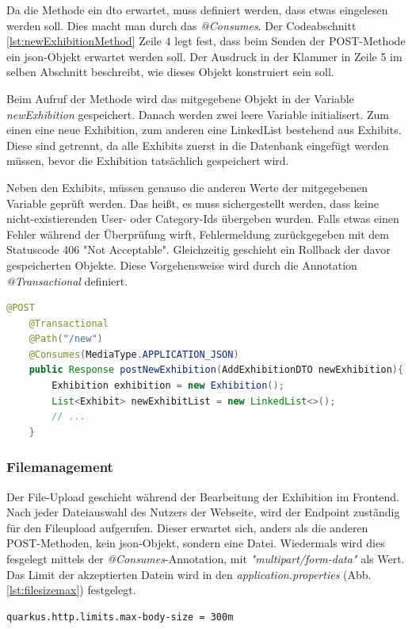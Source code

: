 Da die Methode ein \gls{dto} erwartet, muss definiert werden, dass etwas eingelesen werden soll. 
Dies macht man durch das \emph{@Consumes}. 
Der Codeabschnitt \ref{lst:newExhibitionMethod} Zeile 4 legt fest, dass beim Senden der POST-Methode ein \gls{json}-Objekt erwartet werden soll. 
Der Ausdruck in der Klammer in Zeile 5 im selben Abschnitt beschreibt, wie dieses Objekt konstruiert sein soll.

Beim Aufruf der Methode wird das mitgegebene Objekt in der Variable \emph{newExhibition} gespeichert.
Danach werden zwei leere Variable initialisert. 
Zum einen eine neue Exhibition, zum anderen eine LinkedList bestehend aus Exhibits.
Diese sind getrennt, da alle Exhibits zuerst in die Datenbank eingefügt werden müssen, bevor die Exhibition tatsächlich gespeichert wird. 

Neben den Exhibits, müssen genauso die anderen Werte der mitgegebenen Variable geprüft werden. 
Das heißt, es muss sichergestellt werden, dass keine nicht-existierenden User- oder Category-Ids übergeben wurden. 
Falls etwas einen Fehler während der Überprüfung wirft, Fehlermeldung zurückgegeben mit dem Statuscode 406 "Not Acceptable". 
Gleichzeitig geschieht ein Rollback der davor gespeicherten Objekte. 
Diese Vorgehensweise wird durch die Annotation \emph{@Transactional} definiert. 

\begin{lstlisting}[label=lst:newExhibitionMethod, language=Java, caption=Methode zum Anlegen von Exhibitions]
    @POST
    @Transactional
    @Path("/new")
    @Consumes(MediaType.APPLICATION_JSON)
    public Response postNewExhibition(AddExhibitionDTO newExhibition){
        Exhibition exhibition = new Exhibition();
        List<Exhibit> newExhibitList = new LinkedList<>();
        // ...
    }
\end{lstlisting}

\subsubsection{Filemanagement}
Der File-Upload geschieht während der Bearbeitung der Exhibition im Frontend. 
Nach jeder Dateiauswahl des Nutzers der Webseite, wird der Endpoint zuständig für den Fileupload aufgerufen. 
Dieser erwartet sich, anders als die anderen POST-Methoden, kein \gls{json}-Objekt, sondern eine Datei. 
Wiedermals wird dies fesgelegt mittels der \emph{@Consumes}-Annotation, mit \emph{"multipart/form-data"} als Wert. 
Das Limit der akzeptierten Datein wird in den \emph{application.properties} (Abb. \ref{lst:filesizemax}) festgelegt. 
\begin{lstlisting}[label=lst:filesizemax]
    quarkus.http.limits.max-body-size = 300m
\end{lstlisting}

